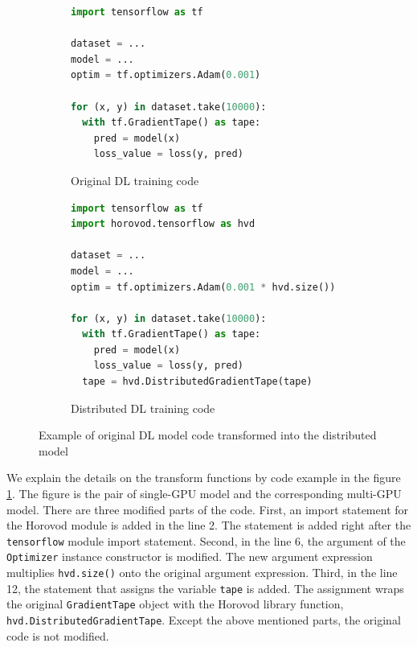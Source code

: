 \begin{figure}[ht!]
  \centering
  \begin{subfigure}[t]{0.48\textwidth}
    \begin{lstlisting}[language=Python]
import tensorflow as tf

dataset = ...
model = ...
optim = tf.optimizers.Adam(0.001) 

for (x, y) in dataset.take(10000):
  with tf.GradientTape() as tape:
    pred = model(x)
    loss_value = loss(y, pred)\end{lstlisting} 
    \caption{Original DL training code}
  \end{subfigure}
  \hspace{5mm}
  \begin{subfigure}[t]{0.48\textwidth}
    \begin{lstlisting}[language=Python]
import tensorflow as tf
import horovod.tensorflow as hvd

dataset = ...
model = ...
optim = tf.optimizers.Adam(0.001 * hvd.size()) 

for (x, y) in dataset.take(10000):
  with tf.GradientTape() as tape:
    pred = model(x)
    loss_value = loss(y, pred) 
  tape = hvd.DistributedGradientTape(tape)\end{lstlisting}
    \caption{Distributed DL training code}
  \end{subfigure}
  \caption{Example of original DL model code transformed into the distributed model}
  \label{fig:trans:ex}
\end{figure}

We explain the details on the transform functions by code example in
the figure \ref{fig:trans:ex}. The figure is the pair of single-GPU model
and the corresponding multi-GPU model.
There are three modified parts of the code. 
First, an import statement for the Horovod module is added in the line 2. 
The statement is added right after the {\tt tensorflow} module import statement.
Second, in the line 6, the argument of the {\tt Optimizer} instance constructor
is modified. The new argument expression multiplies {\tt hvd.size()} 
onto the original argument expression.
Third, in the line 12, the statement that assigns the variable {\tt tape}
is added. The assignment wraps the original {\tt GradientTape} object with
the Horovod library function, {\tt hvd.DistributedGradientTape}.
Except the above mentioned parts, the original code is not modified.     

